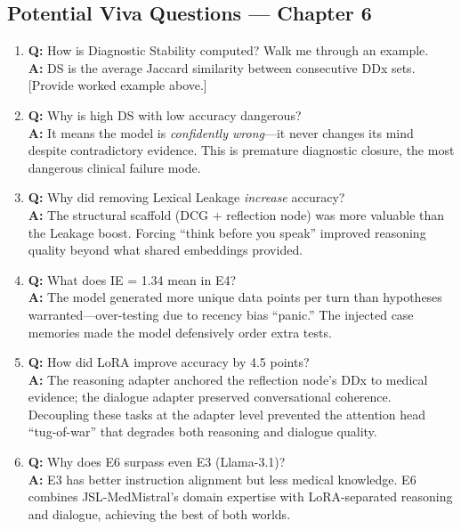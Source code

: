 \subsection{Potential Viva Questions --- Chapter 6}

\begin{vivabox}[\textcolor{white}{Likely Viva Questions}]
\begin{enumerate}
    \item \textbf{Q:} How is Diagnostic Stability computed? Walk me through an example.\\
    \textbf{A:} DS is the average Jaccard similarity between consecutive DDx sets. [Provide worked example above.]

    \item \textbf{Q:} Why is high DS with low accuracy dangerous?\\
    \textbf{A:} It means the model is \textit{confidently wrong}---it never changes its mind despite contradictory evidence. This is premature diagnostic closure, the most dangerous clinical failure mode.

    \item \textbf{Q:} Why did removing Lexical Leakage \textit{increase} accuracy?\\
    \textbf{A:} The structural scaffold (DCG + reflection node) was more valuable than the Leakage boost. Forcing ``think before you speak'' improved reasoning quality beyond what shared embeddings provided.

    \item \textbf{Q:} What does IE = 1.34 mean in E4?\\
    \textbf{A:} The model generated more unique data points per turn than hypotheses warranted---over-testing due to recency bias ``panic.'' The injected case memories made the model defensively order extra tests.

    \item \textbf{Q:} How did LoRA improve accuracy by 4.5 points?\\
    \textbf{A:} The reasoning adapter anchored the reflection node's DDx to medical evidence; the dialogue adapter preserved conversational coherence. Decoupling these tasks at the adapter level prevented the attention head ``tug-of-war'' that degrades both reasoning and dialogue quality.

    \item \textbf{Q:} Why does E6 surpass even E3 (Llama-3.1)?\\
    \textbf{A:} E3 has better instruction alignment but less medical knowledge. E6 combines JSL-MedMistral's domain expertise with LoRA-separated reasoning and dialogue, achieving the best of both worlds.
\end{enumerate}
\end{vivabox}
